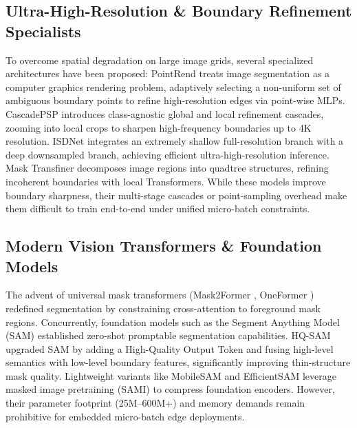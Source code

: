 \documentclass[11pt,a4paper]{article}
\begin{document}
\subsection{Ultra-High-Resolution \& Boundary Refinement Specialists}
To overcome spatial degradation on large image grids, several specialized architectures have been proposed:
PointRend \cite{kirillov2020pointrend} treats image segmentation as a computer graphics rendering problem, adaptively selecting a non-uniform set of ambiguous boundary points to refine high-resolution edges via point-wise MLPs.
CascadePSP \cite{cheng2020cascadepsp} introduces class-agnostic global and local refinement cascades, zooming into local crops to sharpen high-frequency boundaries up to 4K resolution.
ISDNet \cite{guo2022isdnet} integrates an extremely shallow full-resolution branch with a deep downsampled branch, achieving efficient ultra-high-resolution inference.
Mask Transfiner \cite{cui2022mask} decomposes image regions into quadtree structures, refining incoherent boundaries with local Transformers.
While these models improve boundary sharpness, their multi-stage cascades or point-sampling overhead make them difficult to train end-to-end under unified micro-batch constraints.

\subsection{Modern Vision Transformers \& Foundation Models}
The advent of universal mask transformers (Mask2Former \cite{cheng2022masked}, OneFormer \cite{jain2023oneformer}) redefined segmentation by constraining cross-attention to foreground mask regions. Concurrently, foundation models such as the Segment Anything Model (SAM) \cite{kirillov2023segment} established zero-shot promptable segmentation capabilities. HQ-SAM \cite{ke2023hqsam} upgraded SAM by adding a High-Quality Output Token and fusing high-level semantics with low-level boundary features, significantly improving thin-structure mask quality. Lightweight variants like MobileSAM \cite{zhang2023faster} and EfficientSAM \cite{xiong2024efficientsam} leverage masked image pretraining (SAMI) to compress foundation encoders. However, their parameter footprint (25M--600M+) and memory demands remain prohibitive for embedded micro-batch edge deployments.
\end{document}

